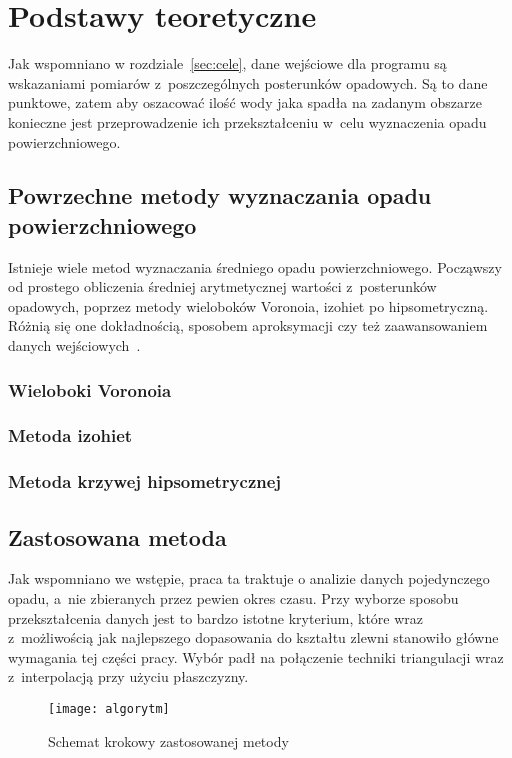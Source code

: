 \chapter{Podstawy teoretyczne}
Jak wspomniano w rozdziale~\ref{sec:cele}, dane wejściowe dla programu są wskazaniami pomiarów z~poszczególnych posterunków opadowych. Są to dane punktowe, zatem aby oszacować ilość wody jaka spadła na zadanym obszarze konieczne jest przeprowadzenie ich przekształceniu w~celu wyznaczenia opadu powierzchniowego.

\section{Powrzechne metody wyznaczania opadu powierzchniowego}

Istnieje wiele metod wyznaczania średniego opadu powierzchniowego. Począwszy od prostego obliczenia średniej arytmetycznej wartości z~posterunków opadowych, poprzez metody wieloboków Voronoia, izohiet po hipsometryczną. Różnią się one dokładnością, sposobem aproksymacji czy też zaawansowaniem danych wejściowych~\cite{opad_metody, opad_obliczanie_opadu_sredniego}.

\subsection{Wieloboki Voronoia}
\subsection{Metoda izohiet}
\subsection{Metoda krzywej hipsometrycznej}

\section{Zastosowana metoda}
\label{sec:zastosowana_metoda}
Jak wspomniano we wstępie, praca ta traktuje o analizie danych pojedynczego opadu, a~nie zbieranych przez pewien okres czasu. Przy wyborze sposobu przekształcenia danych jest to bardzo istotne kryterium, które wraz z~możliwością jak najlepszego dopasowania do kształtu zlewni stanowiło główne wymagania tej części pracy. Wybór padł na połączenie techniki triangulacji wraz z~interpolacją przy użyciu płaszczyzny.

\begin{figure}[!ht]
	\centering
	\texttt{[image: algorytm]}
	\caption{Schemat krokowy zastosowanej metody}
	\label{fig:algorytm}
\end{figure}

